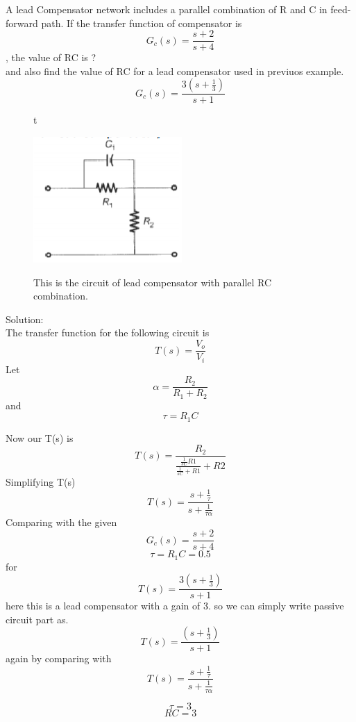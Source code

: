 \begin{enumerate}[label=\thesection.\arabic*.,ref=\thesection.\theenumi]

\begin{frame}
   A lead Compensator network includes a parallel combination of R and C in feed-forward path. If the transfer function of compensator  is $$G_c(s) = \frac{s+2}{s+4}$$, the value of RC is ?\\
   and also find the value of RC for a lead compensator used in previuos example. $$G_c(s) = \frac{3(s+\frac{1}{3})}{s+1}$$
\begin{figure}{t}
    \graphicspath{{./images/}}
    \includegraphics{figs/circuit_lead_compensator.eps}{}
    \centering
    \par
This is the circuit of lead compensator with parallel RC combination.
\end{figure}
Solution:\\
The transfer function for the following circuit is
    $$
    T(s) = \frac{V_o}{V_i}
    $$
    Let
    $$
    \alpha = \frac{R_2}{R_1 + R_2}
    $$
    and 
    $$
    \tau = R_1C
    $$

Now our T(s) is 
    $$
    T(s) = \frac{R_2}{\frac{\frac{1}{sC}R1}{\frac{1}{sC}+R1} + R2}
    $$
    Simplifying T(s)
    $$
    T(s) = \frac{s+\frac{1}{\tau}}{s+\frac{1}{\tau\alpha}}
    $$
    Comparing with the given $$G_c(s) = \frac{s+2}{s+4}$$
    $$
    \tau = R_1C = 0.5
    $$
    for
    $$
    T(s) = \frac{3(s+\frac{1}{3})}{s+1}
    $$
    here this is a lead compensator with a gain of 3.
    so we can simply write passive circuit part as.
     $$
    T(s) = \frac{(s+\frac{1}{3})}{s+1}
    $$
    again by comparing with 
    $$
    T(s) = \frac{s+\frac{1}{\tau}}{s+\frac{1}{\tau\alpha}}
    $$
    
    $$\tau = 3$$
    $$RC = 3$$
\end{frame}

\end{enumerate}
